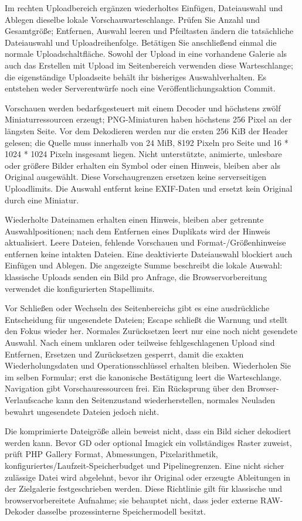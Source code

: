 \documentclass[11pt,a4paper]{article}
\begin{document}
Im rechten Uploadbereich ergänzen wiederholtes Einfügen, Dateiauswahl und
Ablegen dieselbe lokale Vorschauwarteschlange. Prüfen Sie Anzahl und
Gesamtgröße; Entfernen, Auswahl leeren und Pfeiltasten ändern die tatsächliche
Dateiauswahl und Uploadreihenfolge. Betätigen Sie anschließend einmal die
normale Uploadschaltfläche. Sowohl der Upload in eine vorhandene Galerie als
auch das Erstellen mit Upload im Seitenbereich verwenden diese Warteschlange;
die eigenständige Uploadseite behält ihr bisheriges Auswahlverhalten. Es
entstehen weder Serverentwürfe noch eine Veröffentlichungsaktion Commit.

Vorschauen werden bedarfsgesteuert mit einem Decoder und höchstens zwölf
Miniaturressourcen erzeugt; PNG-Miniaturen haben höchstens 256 Pixel an der
längsten Seite. Vor dem Dekodieren werden nur die ersten 256 KiB der Header
gelesen; die Quelle muss innerhalb von 24 MiB, 8192 Pixeln pro Seite und 16 *
1024 * 1024 Pixeln insgesamt liegen. Nicht unterstützte, animierte, unlesbare
oder größere Bilder erhalten ein Symbol oder einen Hinweis, bleiben aber als
Original ausgewählt. Diese Vorschaugrenzen ersetzen keine serverseitigen
Uploadlimits. Die Auswahl entfernt keine EXIF-Daten und ersetzt kein Original
durch eine Miniatur.

Wiederholte Dateinamen erhalten einen Hinweis, bleiben aber getrennte
Auswahlpositionen; nach dem Entfernen eines Duplikats wird der Hinweis
aktualisiert. Leere Dateien, fehlende Vorschauen und Format-/Größenhinweise
entfernen keine intakten Dateien. Eine deaktivierte Dateiauswahl blockiert auch
Einfügen und Ablegen. Die angezeigte Summe beschreibt die lokale Auswahl:
klassische Uploads senden ein Bild pro Anfrage, die Browservorbereitung
verwendet die konfigurierten Stapellimits.

Vor Schließen oder Wechseln des Seitenbereichs gibt es eine ausdrückliche
Entscheidung für ungesendete Dateien; Escape schließt die Warnung und stellt den
Fokus wieder her. Normales Zurücksetzen leert nur eine noch nicht gesendete
Auswahl. Nach einem unklaren oder teilweise fehlgeschlagenen Upload sind
Entfernen, Ersetzen und Zurücksetzen gesperrt, damit die exakten
Wiederholungsdaten und Operationsschlüssel erhalten bleiben. Wiederholen Sie im
selben Formular; erst die kanonische Bestätigung leert die Warteschlange.
Navigation gibt Vorschauressourcen frei. Ein Rücksprung über den
Browser-Verlaufscache kann den Seitenzustand wiederherstellen, normales Neuladen
bewahrt ungesendete Dateien jedoch nicht.

Die komprimierte Dateigröße allein beweist nicht, dass ein Bild sicher dekodiert
werden kann. Bevor GD oder optional Imagick ein vollständiges Raster zuweist,
prüft PHP Gallery Format, Abmessungen, Pixelarithmetik,
konfiguriertes/Laufzeit-Speicherbudget und Pipelinegrenzen. Eine nicht sicher
zulässige Datei wird abgelehnt, bevor ihr Original oder erzeugte Ableitungen in
der Zielgalerie festgeschrieben werden. Diese Richtlinie gilt für klassische und
browservorbereitete Aufnahme; sie behauptet nicht, dass jeder externe
RAW-Dekoder dasselbe prozessinterne Speichermodell besitzt.
\end{document}

